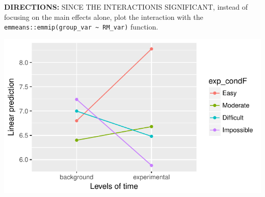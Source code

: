 \documentclass[]{article}
\newenvironment{Shaded}{\begin{snugshade}}{\end{snugshade}}
\newcommand{\KeywordTok}[1]{\textcolor[rgb]{0.13,0.29,0.53}{\textbf{#1}}}
\newcommand{\StringTok}[1]{\textcolor[rgb]{0.31,0.60,0.02}{#1}}
\newcommand{\CommentTok}[1]{\textcolor[rgb]{0.56,0.35,0.01}{\textit{#1}}}
\newcommand{\OperatorTok}[1]{\textcolor[rgb]{0.81,0.36,0.00}{\textbf{#1}}}
\newcommand{\NormalTok}[1]{#1}
\begin{document}
\clearpage

\textbf{DIRECTIONS:} SINCE THE INTERACTIONIS SIGNIFICANT, instead of
focusing on the main effects alone, plot the interaction with the
\texttt{emmeans::emmip(group\_var\ \textasciitilde{}\ RM\_var)}
function.

\begin{Shaded}
\end{Shaded}

\begin{center}\includegraphics{Unit_5_assignment_KEY_R__spr18__files/figure-latex/unnamed-chunk-90-1} \end{center}
\end{document}
